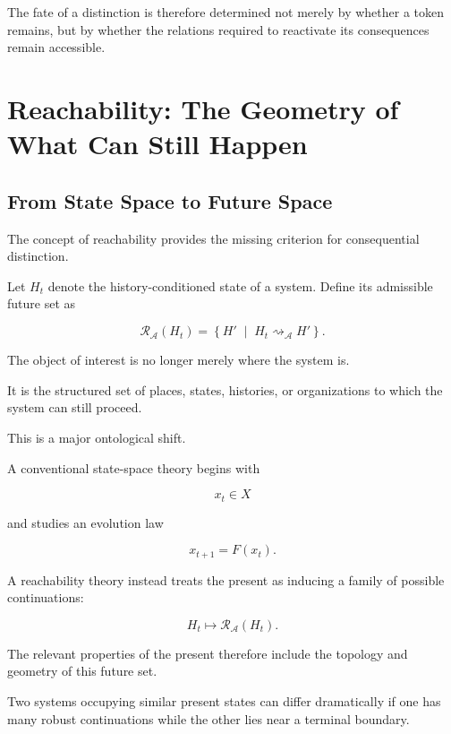 \documentclass[11pt]{article}
\theoremstyle{remark}
\newcommand{\Adm}{\mathcal{A}}
\newcommand{\Reach}{\mathcal{R}}
\begin{document}
The fate of a distinction is therefore determined not merely by whether a token remains, but by whether the relations required to reactivate its consequences remain accessible.

\section{Reachability: The Geometry of What Can Still Happen}

\subsection{From State Space to Future Space}

The concept of reachability provides the missing criterion for consequential distinction.

Let $H_t$ denote the history-conditioned state of a system. Define its admissible future set as

\begin{equation}
\Reach_{\Adm}(H_t)
=
\left\{
H'
\;\middle|\;
H_t
\rightsquigarrow_{\Adm}
H'
\right\}.
\end{equation}

The object of interest is no longer merely where the system is.

It is the structured set of places, states, histories, or organizations to which the system can still proceed.

This is a major ontological shift.

A conventional state-space theory begins with

\begin{equation}
x_t\in X
\end{equation}

and studies an evolution law

\begin{equation}
x_{t+1}=F(x_t).
\end{equation}

A reachability theory instead treats the present as inducing a family of possible continuations:

\begin{equation}
H_t
\longmapsto
\Reach_{\Adm}(H_t).
\end{equation}

The relevant properties of the present therefore include the topology and geometry of this future set.

Two systems occupying similar present states can differ dramatically if one has many robust continuations while the other lies near a terminal boundary.
\end{document}
